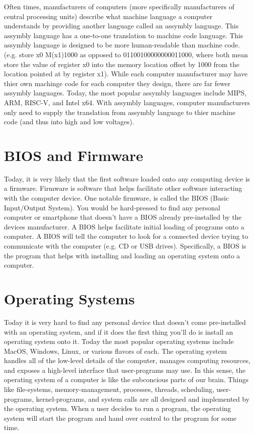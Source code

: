 Often times, manufacturers of computers (more specifically manufacturers of central processing units)
describe what machine language a computer understands by providing another language called
an assymbly language. This assymbly language has a one-to-one translation to machine code language.
This assymbly language is designed to be more human-readable than machine code. (e.g. store x0 M(x1)1000
as opposed to 01100100000000011000, where both mean store the value of register x0 into the memory location
offset by 1000 from the location pointed at by register x1). While each computer manufacturer may
have thier own machinge code for each computer they design, there are far fewer assymbly languages.
Today, the most popular assymbly languages include MIPS, ARM, RISC-V, and Intel x64. With assymbly
languages, computer manufacturers only need to supply the translation from assymbly language
to thier machine code (and thus into high and low voltages).

\section{BIOS and Firmware}
Today, it is very likely that the first software loaded onto any computing device is a firmware.
Firmware is software that helps facilitate other software interacting with the computer device.
One notable firmware, is called the BIOS (Basic Input/Output System). You would be hard-pressed
to find any personal computer or smartphone that doesn't have a BIOS already pre-installed by
the devices manufacturer. A BIOS helps facilitate initial loading of programs onto a computer.
A BIOS will tell the computer to look for a connected device trying to communicate with the
computer (e.g. CD or USB drives). Specifically, a BIOS is the program that helps with installing
and loading an operating system onto a computer.

\section{Operating Systems}
Today it is very hard to find any personal device that doesn't come pre-installed with an
operating system, and if it does the first thing you'll do is install an operating system
onto it. Today the most popular operating systems include MacOS, Windows, Linux, or
various flavors of each. The operating system handles all of the low-level details of the
computer, manages computing resources, and exposes a high-level interface that user-programs
may use. In this sense, the operating system of a computer is like the subconcious parts
of our brain. Things like file-systems, memory-management, processes, threads, scheduling,
user-programs, kernel-programs, and system calls are all designed and implemented by the
operating system. When a user decides to run a program, the operating system will start
the program and hand over control to the program for some time.

